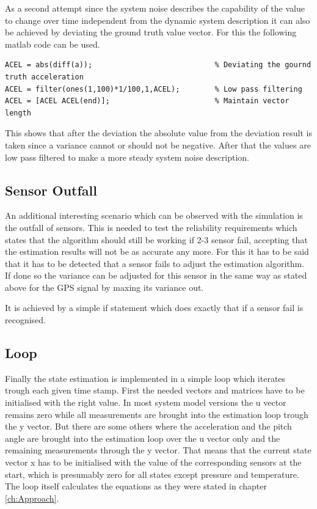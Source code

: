 As a second attempt since the system noise describes the capability of the value to change over time independent from the dynamic system description
it can also be achieved by deviating the ground truth value vector.
For this the following matlab code can be used.
\begin{lstlisting}[caption={System noise generation with deviation}]
ACEL = abs(diff(a));                            % Deviating the gournd truth acceleration
ACEL = filter(ones(1,100)*1/100,1,ACEL);        % Low pass filtering
ACEL = [ACEL ACEL(end)];                        % Maintain vector length
\end{lstlisting}
This shows that after the deviation the absolute value from the deviation result is taken since a variance cannot or should not be negative.
After that the values are low pass filtered to make a more steady system noise description.

\subsection{Sensor Outfall}

An additional interesting scenario which can be observed with the simulation is the outfall of sensors.
This is needed to test the reliability requirements which states that the algorithm should still be working if 2-3 sensor fail, accepting that the estimation results will not be as accurate any more.
For this it has to be said that it has to be detected that a sensor fails to adjust the estimation algorithm.
If done so the variance can be adjusted for this sensor in the same way as stated above for the GPS signal by maxing its variance out.

It is achieved by a simple if statement which does exactly that if a sensor fail is recognised.

\subsection{Loop}
Finally the state estimation is implemented in a simple loop which iterates trough each given time stamp.
First the needed vectors and matrices have to be initialised with the right value.
In most system model versions the u vector remains zero while all measurements are brought into the estimation loop trough the y vector.
But there are some others where the acceleration and the pitch angle are brought into the estimation loop over the u vector only and the remaining measurements through the y vector.
That means that the current state vector x has to be initialised with the value of the corresponding sensors at the start,
which is presumably zero for all states except pressure and temperature.
The loop itself calculates the equations as they were stated in chapter \ref{ch:Approach}.

